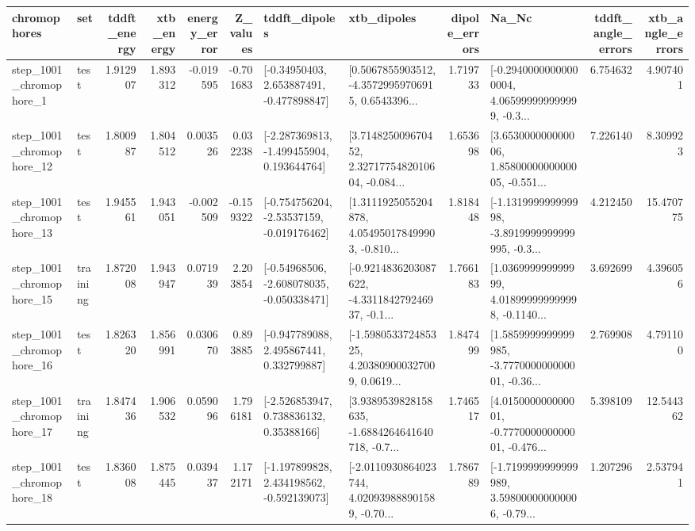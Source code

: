 \begin{tabular}{llrrrrllrlrr}
\toprule
             chromophores &       set &  tddft\_energy &  xtb\_energy &  energy\_error &  Z\_values &                               tddft\_dipoles &                                        xtb\_dipoles &  dipole\_errors &                                              Na\_Nc &  tddft\_angle\_errors &  xtb\_angle\_errors \\
\midrule
  step\_1001\_chromophore\_1 &      test &      1.912907 &    1.893312 &     -0.019595 & -0.701683 &    [-0.34950403, 2.653887491, -0.477898847] &  [0.5067855903512, -4.35729959706915, 0.6543396... &       1.719733 &  [-0.29400000000000004, 4.065999999999999, -0.3... &            6.754632 &          4.907401 \\
 step\_1001\_chromophore\_12 &      test &      1.800987 &    1.804512 &      0.003526 &  0.032238 &   [-2.287369813, -1.499455904, 0.193644764] &  [3.714825009670452, 2.3271775482010604, -0.084... &       1.653698 &  [3.653000000000006, 1.8580000000000005, -0.551... &            7.226140 &          8.309923 \\
 step\_1001\_chromophore\_13 &      test &      1.945561 &    1.943051 &     -0.002509 & -0.159322 &   [-0.754756204, -2.53537159, -0.019176462] &  [1.3111925055204878, 4.054950178499903, -0.810... &       1.818448 &  [-1.131999999999998, -3.8919999999999995, -0.3... &            4.212450 &         15.470775 \\
 step\_1001\_chromophore\_15 &  training &      1.872008 &    1.943947 &      0.071939 &  2.203854 &   [-0.54968506, -2.608078035, -0.050338471] &  [-0.9214836203087622, -4.331184279246937, -0.1... &       1.766183 &  [1.036999999999999, 4.018999999999998, -0.1140... &            3.692699 &          4.396056 \\
 step\_1001\_chromophore\_16 &      test &      1.826320 &    1.856991 &      0.030670 &  0.893885 &    [-0.947789088, 2.495867441, 0.332799887] &  [-1.598053372485325, 4.203809000327009, 0.0619... &       1.847499 &  [1.5859999999999985, -3.777000000000001, -0.36... &            2.769908 &          4.791100 \\
 step\_1001\_chromophore\_17 &  training &      1.847436 &    1.906532 &      0.059096 &  1.796181 &     [-2.526853947, 0.738836132, 0.35388166] &  [3.9389539828158635, -1.6884264641640718, -0.7... &       1.746517 &  [4.015000000000001, -0.777000000000001, -0.476... &            5.398109 &         12.544362 \\
 step\_1001\_chromophore\_18 &      test &      1.836008 &    1.875445 &      0.039437 &  1.172171 &   [-1.197899828, 2.434198562, -0.592139073] &  [-2.0110930864023744, 4.020939888901589, -0.70... &       1.786789 &  [-1.7199999999999989, 3.598000000000006, -0.79... &            1.207296 &          2.537941 \\

\end{tabular}
